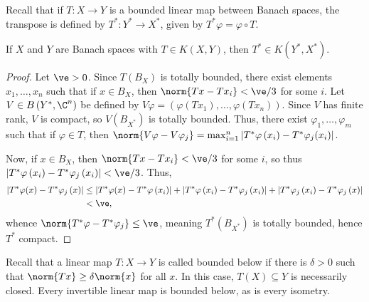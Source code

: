 \documentclass[10pt]{mypackage}
\begin{document}
Recall that if $T\colon X\rightarrow Y$ is a bounded linear map between Banach spaces, the transpose is defined by $T^{\ast}\colon Y^{\ast}\rightarrow X^{\ast}$, given by $T^{\ast}\varphi = \varphi\circ T$.
\begin{theorem}
  If $X$ and $Y$ are Banach spaces with $T\in K\left( X,Y \right)$, then $T^{\ast}\in K\left( Y^{\ast},X^{\ast} \right)$.
\end{theorem}
\begin{proof}
  Let $\ve > 0$. Since $T\left(B_X\right)$ is totally bounded, there exist elements $x_1,\dots,x_n$ such that if $x\in B_X$, then $\norm{Tx - Tx_i} < \ve/3$ for some $i$. Let $V\in B\left( Y^{\ast},\C^n \right)$ be defined by $V\varphi = \left( \varphi\left( Tx_1 \right),\dots,\varphi\left( Tx_n \right) \right)$. Since $V$ has finite rank, $V$ is compact, so $V\left( B_{X^{\ast}} \right)$ is totally bounded. Thus, there exist $\varphi_1,\dots,\varphi_m$ such that if $\varphi\in T$, then $\norm{V\varphi - V\varphi_j} = \max_{i=1}^{n} \left\vert T^{\ast}\varphi\left(x_i\right) - T^{\ast}\varphi_j(x_i) \right\vert$.

  Now, if $x\in B_X$, then $\norm{Tx - Tx_i} < \ve/3$ for some $i$, so thus $ \left\vert T^{\ast}\varphi\left( x_i \right) - T^{\ast}\varphi_j\left( x_i \right) \right\vert < \ve/3$. Thus,
  \begin{align*}
    \left\vert T^{\ast}\varphi(x) - T^{\ast}\varphi_j\left( x \right) \right\vert &\leq \left\vert T^{\ast}\varphi(x) - T^{\ast}\varphi\left(x_i\right) \right\vert + \left\vert T^{\ast}\varphi\left( x_i \right) - T^{\ast}\varphi_j\left( x_i \right) \right\vert + \left\vert T^{\ast}\varphi_j\left( x_i \right) - T^{\ast}\varphi_j\left( x \right) \right\vert\\
                                                                                  &< \ve,
  \end{align*}
  whence $\norm{T^{\ast}\varphi - T^{\ast}\varphi_j}\leq \ve$, meaning $T^{\ast}\left( B_{X^{\ast}} \right)$ is totally bounded, hence $T^{\ast}$ compact.
\end{proof}
Recall that a linear map $T\colon X\rightarrow Y$ is called bounded below if there is $\delta > 0$ such that $\norm{Tx}\geq \delta \norm{x}$ for all $x$. In this case, $T\left( X \right)\subseteq Y$ is necessarily closed. Every invertible linear map is bounded below, as is every isometry.
\end{document}
